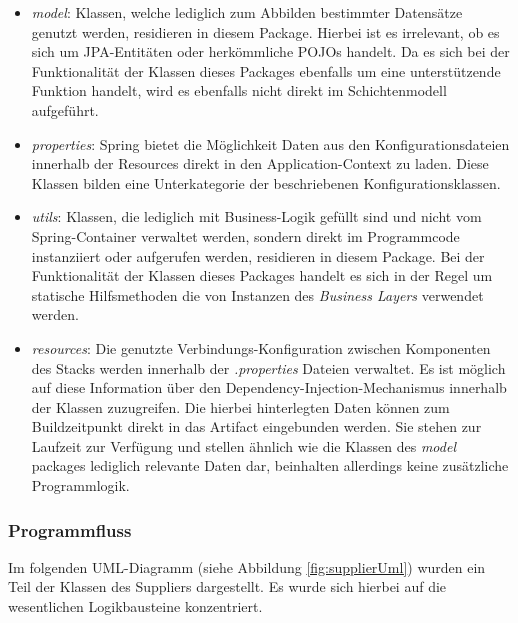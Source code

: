 \begin{itemize}
  \item \emph{model}: Klassen, welche lediglich zum Abbilden bestimmter Datensätze genutzt werden, residieren in diesem Package. Hierbei ist es irrelevant, ob es sich um JPA-Entitäten oder herkömmliche POJOs handelt. Da es sich bei der Funktionalität der Klassen dieses Packages ebenfalls um eine unterstützende Funktion handelt, wird es ebenfalls nicht direkt im Schichtenmodell aufgeführt.

  \item \emph{properties}: Spring bietet die Möglichkeit Daten aus den Konfigurationsdateien innerhalb der Resources direkt in den Application-Context zu laden. Diese Klassen bilden eine Unterkategorie der beschriebenen Konfigurationsklassen.
  
  \item \emph{utils}: Klassen, die lediglich mit Business-Logik gefüllt sind und nicht vom Spring-Container verwaltet werden, sondern direkt im Programmcode instanziiert oder aufgerufen werden, residieren in diesem Package. Bei der Funktionalität der Klassen dieses Packages handelt es sich in der Regel um statische Hilfsmethoden die von Instanzen des \emph{Business Layers} verwendet werden.
  
  \item \emph{resources}: Die genutzte Verbindungs-Konfiguration zwischen Komponenten des Stacks werden innerhalb der \emph{.properties} Dateien verwaltet. Es ist möglich auf diese Information über den Dependency-Injection-Mechanismus innerhalb der Klassen zuzugreifen. Die hierbei hinterlegten Daten können zum Buildzeitpunkt direkt in das Artifact eingebunden werden. Sie stehen zur Laufzeit zur Verfügung und stellen ähnlich wie die Klassen des \emph{model} packages lediglich relevante Daten dar, beinhalten allerdings keine zusätzliche Programmlogik. 

\end{itemize}

\newpage

\subsubsection{Programmfluss}
Im folgenden UML-Diagramm (siehe Abbildung \ref{fig:supplierUml}) wurden ein Teil der Klassen des Suppliers dargestellt. Es wurde sich hierbei auf die wesentlichen Logikbausteine konzentriert. 

